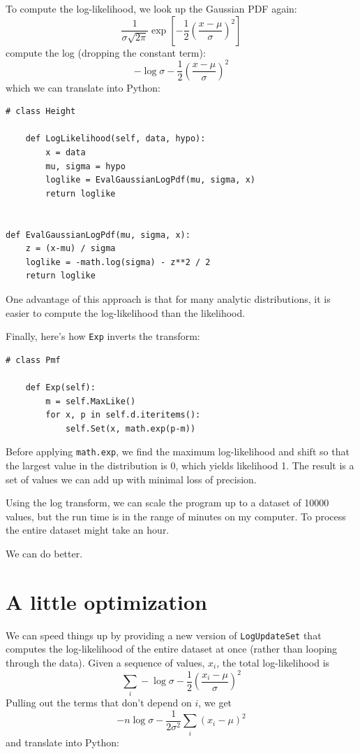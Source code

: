\documentclass[12pt]{book}
\begin{document}
To compute the log-likelihood, we look up the Gaussian PDF again:
%
\[ \frac{1}{\sigma \sqrt{2 \pi}} \exp \left[ -\frac{1}{2} \left( \frac{x-\mu}{\sigma} \right)^2 \right] \]
%
compute the log (dropping the constant term):
%
\[ -\log \sigma -\frac{1}{2} \left( \frac{x-\mu}{\sigma} \right)^2 \]
%
which we can translate into Python:

\begin{verbatim}
# class Height

    def LogLikelihood(self, data, hypo):
        x = data
        mu, sigma = hypo
        loglike = EvalGaussianLogPdf(mu, sigma, x)
        return loglike


def EvalGaussianLogPdf(mu, sigma, x):
    z = (x-mu) / sigma
    loglike = -math.log(sigma) - z**2 / 2
    return loglike
\end{verbatim}

One advantage of this approach is that for many analytic
distributions, it is easier to compute the log-likelihood than the
likelihood.

Finally, here's how {\tt Exp} inverts the transform:

\begin{verbatim}
# class Pmf

    def Exp(self):
        m = self.MaxLike()
        for x, p in self.d.iteritems():
            self.Set(x, math.exp(p-m))
\end{verbatim}

Before applying {\tt math.exp}, we find the maximum log-likelihood
and shift so that the largest value in the distribution is 0, which
yields likelihood 1.  The result is a set of values we can add
up with minimal loss of precision.

Using the log transform, we can scale the program up to a dataset
of 10000 values, but the run time is in the range of minutes on
my computer.  To process the entire dataset might take an hour.

We can do better.


\section{A little optimization}

We can speed things up by providing a new version of \verb"LogUpdateSet"
that computes the log-likelihood of the entire dataset at once (rather
than looping through the data).  Given a sequence of values, $x_i$,
the total log-likelihood is
%
\[ \sum_i -\log \sigma - \frac{1}{2} \left( \frac{x_i-\mu}{\sigma} \right)^2 \]
%
Pulling out the terms that don't depend on $i$, we get
%
\[ -n \log \sigma - \frac{1}{2 \sigma^2} \sum_i \left( x_i - \mu \right)^2 \]
%
and translate into Python:
\end{document}
